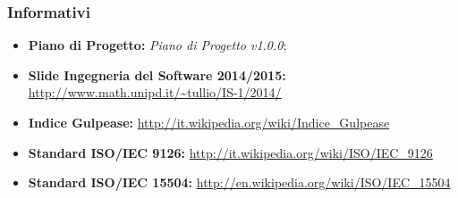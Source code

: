 	\subsubsection{Informativi}
	\begin{itemize}
		\item \textbf{Piano di Progetto:} \textit{Piano di Progetto v1.0.0};
		\item \textbf{Slide Ingegneria del Software 2014/2015:} \url{http://www.math.unipd.it/~tullio/IS-1/2014/}
		\item \textbf{Indice Gulpease:} \url{http://it.wikipedia.org/wiki/Indice_Gulpease}
		\item \textbf{Standard ISO/IEC 9126:} \url{http://it.wikipedia.org/wiki/ISO/IEC_9126}
		\item \textbf{Standard ISO/IEC 15504:} \url{http://en.wikipedia.org/wiki/ISO/IEC_15504}
	\end{itemize}